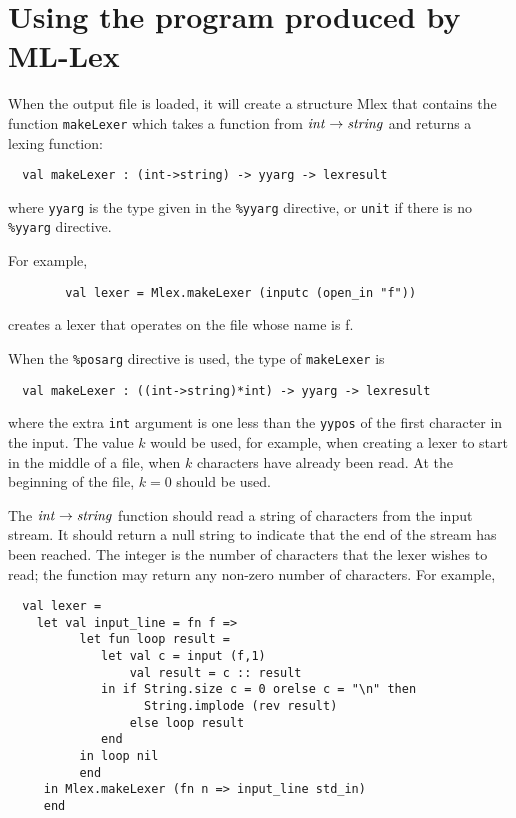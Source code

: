 \section{Using the program produced by ML-Lex}

When the output file is loaded, it will create a structure Mlex that
contains the function {\tt makeLexer} which takes a function from
${\it int} \rightarrow {\it string}$ and returns a lexing function:

\begin{verbatim}
  val makeLexer : (int->string) -> yyarg -> lexresult
\end{verbatim}
where {\tt yyarg} is the type given in the {\tt \%yyarg} directive,
or {\tt unit} if there is no {\tt \%yyarg} directive.

For example,

\begin{verbatim}
        val lexer = Mlex.makeLexer (inputc (open_in "f"))
\end{verbatim}

creates a lexer that operates on the file whose name is f.

When the {\tt \%posarg} directive is used, the type of
{\tt makeLexer} is 
\begin{verbatim}
  val makeLexer : ((int->string)*int) -> yyarg -> lexresult
\end{verbatim}
where the extra {\tt int} argument is one less than the {\tt yypos}
of the first character in the input.  The value $k$ would be used,
for example, when creating
a lexer to start in the middle of a file, when $k$ characters have
already been read.  At the beginning of the file, $k=0$ should be used.

The ${\it int} \rightarrow {\it string}$ function
should read a string of characters
from the input stream.  It should return a null string to indicate
that the end of the stream has been reached.  The integer is the
number of characters that the lexer wishes to read; the function may
return any non-zero number of characters.  For example, 

\begin{verbatim}
  val lexer = 
    let val input_line = fn f =>
          let fun loop result =
             let val c = input (f,1)
                 val result = c :: result
             in if String.size c = 0 orelse c = "\n" then
                   String.implode (rev result)
                 else loop result
             end
          in loop nil
          end
     in Mlex.makeLexer (fn n => input_line std_in)
     end
\end{verbatim}

